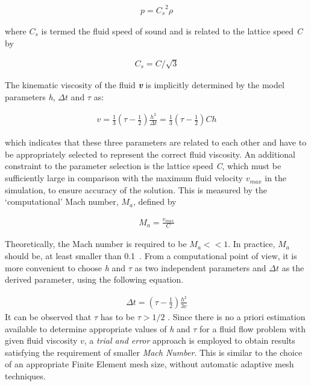 \begin{align}
\mathit{p}=\mathit{C_s}^{2} \rho
\end{align}

where $\mathit{C_s}$ is termed the fluid speed of sound and is related to the 
lattice speed \textit{C} by

\begin{align}
\mathit{C_s}=\mathit{C}/\sqrt{3}
\end{align}

The kinematic viscosity of the fluid \textbf{\textit{v}} is implicitly 
determined by the model parameters \textit{h}, $\Delta \mathit{t}$ and $\tau$ 
as:

\begin{align}
\mathit{v}=\frac{1}{3}(\tau - \frac{1}{2})\frac{\mathit{h}^{2}}{\Delta \mathit{t}} = \frac{1}{3}(\tau - \frac{1}{2})\mathit{Ch}
\end{align}

which indicates that these three parameters are related to each other and have 
to be appropriately selected to represent the correct fluid viscosity. An 
additional constraint to the parameter selection is the lattice speed 
\textit{C}, which must be sufficiently large in comparison with the maximum 
fluid velocity $\mathit{v}_{\mathit{max}}$ in the simulation, to ensure 
accuracy of the solution. This is measured by the `computational' Mach number, 
$\mathit{M}_{\mathit{a}}$, defined by

\begin{align}
\mathit{M}_{\mathit{a}}=\frac{\mathit{v}_{\mathit{max}}}{\mathit{C}}
\end{align}

Theoretically, the Mach number is required to be $\mathit{M}_{\mathit{a}}<< 1$. 
In practice, $\mathit{M}_{\mathit{a}}$ should be, at least smaller than 
0.1~\citep{He1997}. From a computational point of view, it is more convenient 
to choose \textit{h} and $\tau$ as two independent parameters and $\Delta 
\mathit{t}$ as the derived parameter, using the following equation.

\begin{align}
\Delta \mathit{t} = (\tau - \frac{1}{2}) \frac{h^{2}}{3\mathit{v}}
\end{align}
It can be observed that $\tau$ has to be $\tau > 1/2$ \citep{He1997}. Since 
there is no a priori estimation available to determine appropriate values of 
\textit{h} and $\tau$ for a fluid flow problem with given fluid viscosity 
$\mathit{v}$, a \textit{trial and error} approach is employed to obtain results 
satisfying the requirement of smaller \textit{Mach Number}. This is similar to 
the choice of an appropriate Finite Element mesh size, without automatic 
adaptive mesh techniques. 

